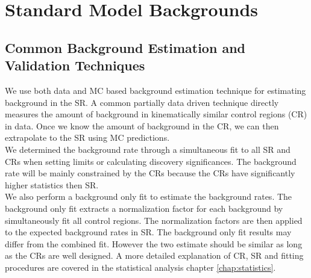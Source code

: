 \chapter{Standard Model Backgrounds}
\label{chap:backgrounds}

\section{Common Background Estimation and Validation Techniques}
\label{sec:Bkg:Tech}

\indent We use both data and MC based background estimation technique for estimating background in the SR.  A common partially data driven technique directly measures the amount of background in kinematically similar control regions (CR) in data.  Once we know the amount of background in the CR, we can then extrapolate to the SR using MC predictions. \\

\indent We determined the background rate through a simultaneous fit to all SR and CRs when setting limits or calculating discovery significances.  The background rate will be mainly constrained by the CRs because the CRs have significantly higher statistics then SR.  \\

\indent We also perform a background only fit to estimate the background rates.  The background only fit extracts a normalization factor for each background by simultaneously fit all control regions.  The normalization factors are then applied to the expected background rates in SR.  The background only fit results may differ from the combined fit. However the two estimate should be similar as long as the CRs are well designed.   A more detailed explanation of CR, SR and fitting procedures are covered in the statistical analysis chapter \ref{chap:statistics}.  \\



